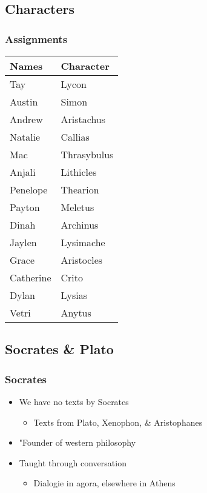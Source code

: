 \documentclass[11pt]{article}
\begin{document}
\subsection{Characters}
\label{sec:org7d691f6}
\subsubsection{Assignments}
\label{sec:org3c24253}
\begin{center}
\begin{tabular}{ll}
Names & Character\\
\hline
Tay & Lycon\\
Austin & Simon\\
Andrew & Aristachus\\
Natalie & Callias\\
Mac & Thrasybulus\\
Anjali & Lithicles\\
Penelope & Thearion\\
Payton & Meletus\\
Dinah & Archinus\\
Jaylen & Lysimache\\
Grace & Aristocles\\
Catherine & Crito\\
Dylan & Lysias\\
Vetri & Anytus\\
\end{tabular}
\end{center}

\subsection{Socrates \& Plato}
\label{sec:orgc00df13}
\subsubsection{Socrates}
\label{sec:org7f02bc3}
\begin{itemize}
\item We have no texts by Socrates
\begin{itemize}
\item Texts from Plato, Xenophon, \& Aristophanes
\end{itemize}
\item "Founder of western philosophy
\item Taught through conversation
\begin{itemize}
\item Dialogie in agora, elsewhere in Athens
\end{itemize}
\end{itemize}
\end{document}
